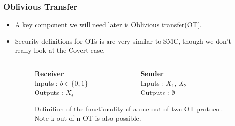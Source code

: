 \documentclass{beamer}
\begin{document}
	\begin{frame}
		\frametitle{Oblivious Transfer}
		\begin{itemize}
			\item A key component we will need later is Oblivious transfer(OT).
			\item Security definitions for OTs is are very similar to SMC, though we don't really look at the Covert case.
      
			\begin{figure}[!htb]
				\centering
				\begin{columns}
					\begin{column}{0.45\textwidth}
						\centering
						\textbf{Receiver}\\
						Inputs : $b \in \{0, 1\}$\\
						Outputs : $X_b$\\
					\end{column}

					\begin{column}{0.45\textwidth}
						\centering
						\textbf{Sender}\\
						Inputs : $X_1$, $X_2$\\
						Outputs : $\emptyset$\\
					\end{column}
				\end{columns}
				\caption{ Definition of the functionality of a one-out-of-two OT protocol. Note k-out-of-n OT is also possible.\label{fig:OTformalDef}}
			\end{figure}
		\end{itemize}
	\end{frame}
\end{document}
